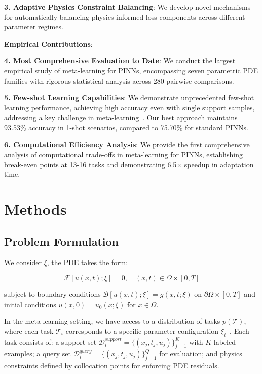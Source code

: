 \documentclass[review]{elsarticle}
\begin{document}
\textbf{3. Adaptive Physics Constraint Balancing}: We develop novel mechanisms for automatically balancing physics-informed loss components across different parameter regimes.

\textbf{Empirical Contributions}:

\textbf{4. Most Comprehensive Evaluation to Date}: We conduct the largest empirical study of meta-learning for PINNs, encompassing seven parametric PDE families with rigorous statistical analysis across 280 pairwise comparisons.

\textbf{5. Few-shot Learning Capabilities}: We demonstrate unprecedented few-shot learning performance, achieving high accuracy even with single support samples, addressing a key challenge in meta-learning~\cite{snell2017prototypical,vinyals2016matching}. Our best approach maintains 93.53\% accuracy in 1-shot scenarios, compared to 75.70\% for standard PINNs.

\textbf{6. Computational Efficiency Analysis}: We provide the first comprehensive analysis of computational trade-offs in meta-learning for PINNs, establishing break-even points at 13-16 tasks and demonstrating 6.5× speedup in adaptation time.

\section{Methods}

\subsection{Problem Formulation}

We consider $\xi$, the PDE takes the form:

\begin{equation}
\mathcal{F}[u(x,t); \xi] = 0, \quad (x,t) \in \Omega \times [0,T]
\end{equation}

subject to boundary conditions $\mathcal{B}[u(x,t); \xi] = g(x,t; \xi)$ on $\partial\Omega \times [0,T]$ and initial conditions $u(x,0) = u_0(x; \xi)$ for $x \in \Omega$.

In the meta-learning setting, we have access to a distribution of tasks $p(\mathcal{T})$, where each task $\mathcal{T}_i$ corresponds to a specific parameter configuration $\xi_i$~\cite{finn2017model,hospedales2021meta}. Each task consists of: a support set $\mathcal{D}_i^{support} = \{(x_j, t_j, u_j)\}_{j=1}^{K}$ with $K$ labeled examples; a query set $\mathcal{D}_i^{query} = \{(x_j, t_j, u_j)\}_{j=1}^{Q}$ for evaluation; and physics constraints defined by collocation points for enforcing PDE residuals.
\end{document}
